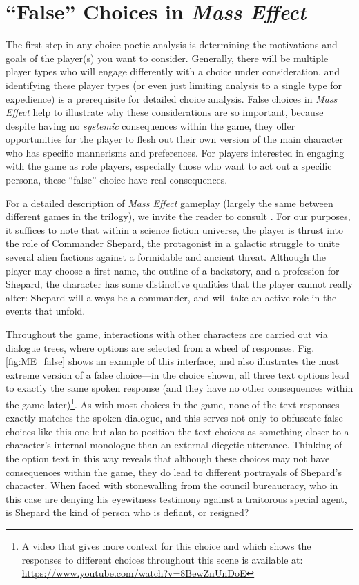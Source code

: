 \documentclass[arts,article,submit,moreauthors,pdftex,10pt,a4paper]{Definitions/mdpi}
\begin{document}
\section{``False'' Choices in \emph{Mass Effect}}

The first step in any choice poetic analysis is determining the motivations and goals of the player(s) you want to consider.
%
Generally, there will be multiple player types who will engage differently with a choice under consideration, and identifying these player types (or even just limiting analysis to a single type for expedience) is a prerequisite for detailed choice analysis.
%
False choices in \emph{Mass Effect} help to illustrate why these considerations are so important, because despite having no \emph{systemic} consequences within the game, they offer opportunities for the player to flesh out their own version of the main character who has specific mannerisms and preferences.
%
For players interested in engaging with the game as role players, especially those who want to act out a specific persona, these ``false'' choice have real consequences.


For a detailed description of \emph{Mass Effect} gameplay (largely the same between different games in the trilogy), we invite the reader to consult \cite{bizzocchi2012mass}.
%
For our purposes, it suffices to note that within a science fiction universe, the player is thrust into the role of Commander Shepard, the protagonist in a galactic struggle to unite several alien factions against a formidable and ancient threat.
%
Although the player may choose a first name, the outline of a backstory, and a profession for Shepard, the character has some distinctive qualities that the player cannot really alter: Shepard will always be a commander, and will take an active role in the events that unfold.


Throughout the game, interactions with other characters are carried out via dialogue trees, where options are selected from a wheel of responses.
%
Fig. \ref{fig:ME_false} shows an example of this interface, and also illustrates the most extreme version of a false choice---in the choice shown, all three text options lead to exactly the same spoken response (and they have no other consequences within the game later)\footnote{A video that gives more context for this choice and which shows the responses to different choices throughout this scene is available at: \url{https://www.youtube.com/watch?v=8BewZnUnDoE}}.
%
As with most choices in the game, none of the text responses exactly matches the spoken dialogue, and this serves not only to obfuscate false choices like this one but also to position the text choices as something closer to a character's internal monologue than an external diegetic utterance.
%
Thinking of the option text in this way reveals that although these choices may not have consequences within the game, they do lead to different portrayals of Shepard's character.
%
When faced with stonewalling from the council bureaucracy, who in this case are denying his eyewitness testimony against a traitorous special agent, is Shepard the kind of person who is defiant, or resigned?
\end{document}
